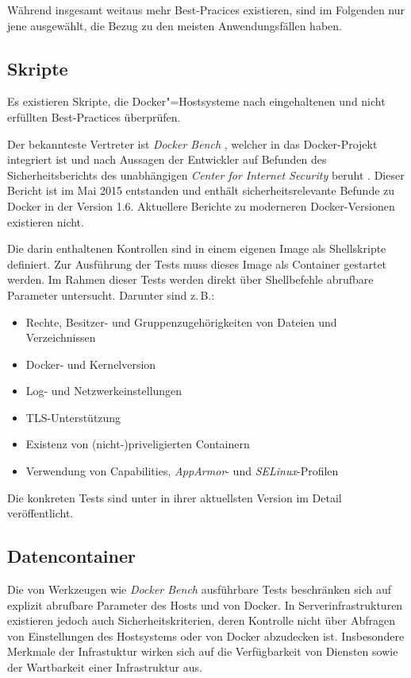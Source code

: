 \documentclass[../main.tex]{subfiles}
\begin{document}
    Während insgesamt weitaus mehr Best-Pracices existieren, sind im Folgenden nur jene ausgewählt, die Bezug zu den meisten Anwendungsfällen haben.

    \subsection{Skripte}
      Es existieren Skripte, die Docker"=Hostsysteme nach eingehaltenen und nicht erfüllten Best-Practices überprüfen.

      Der bekannteste Vertreter ist \emph{Docker Bench} \cite{githubDockerBench}, welcher in das Docker-Projekt integriert ist und nach Aussagen der Entwickler auf Befunden des Sicherheitsberichts des unabhängigen \emph{Center for Internet Security} beruht \cite{dockerBenchmarkCIS}. Dieser Bericht ist im Mai 2015 entstanden und enthält sicherheitsrelevante Befunde zu Docker in der Version 1.6. Aktuellere Berichte zu moderneren Docker-Versionen existieren nicht.

      Die darin enthaltenen Kontrollen sind in einem eigenen Image als Shellskripte definiert. Zur Ausführung der Tests muss dieses Image als Container gestartet werden. Im Rahmen dieser Tests werden direkt über Shellbefehle abrufbare Parameter untersucht. Darunter sind z.\,B.:

      \begin{itemize}
        \item Rechte, Besitzer- und Gruppenzugehörigkeiten von Dateien und Verzeichnissen
        \item Docker- und Kernelversion
        \item Log- und Netzwerkeinstellungen
        \item TLS-Unterstützung
        \item Existenz von (nicht-)priveligierten Containern
        \item Verwendung von Capabilities, \emph{AppArmor}- und \emph{SELinux}-Profilen
      \end{itemize}

      Die konkreten Tests sind unter \cite{githubDockerBenchTests} in ihrer aktuellsten Version im Detail veröffentlicht.

    \subsection{Datencontainer}
      Die von Werkzeugen wie \emph{Docker Bench} ausführbare Tests beschränken sich auf explizit abrufbare Parameter des Hosts und von Docker. In Serverinfrastrukturen existieren jedoch auch Sicherheitskriterien, deren Kontrolle nicht über Abfragen von Einstellungen des Hostsystems oder von Docker abzudecken ist. Insbesondere Merkmale der Infrastuktur wirken sich auf die Verfügbarkeit von Diensten sowie der Wartbarkeit einer Infrastruktur aus.
\end{document}
